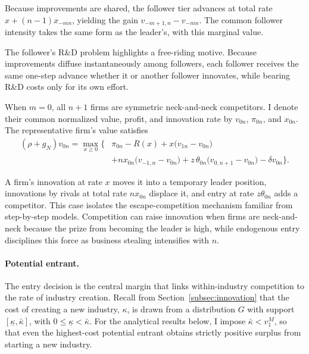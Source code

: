 \documentclass[12pt]{article}
\begin{document}
Because improvements are shared, the follower tier advances at total rate \(x + (n-1)x_{-mn}\), yielding the gain \(v_{-m+1,n}-v_{-mn}\). The common follower intensity takes the same form as the leader's, with this marginal value.

The follower's R\&D problem highlights a free-riding motive. Because improvements diffuse instantaneously among followers, each follower receives the same one-step advance whether it or another follower innovates, while bearing R\&D costs only for its own effort.

When \(m=0\), all \(n+1\) firms are symmetric neck-and-neck competitors. I denote their common normalized value, profit, and innovation rate by \(v_{0n}\), \(\pi_{0n}\), and \(x_{0n}\). The representative firm's value satisfies
\begin{align}
(\rho+g_N)v_{0n}=\max_{x\ge0}\Big\{&\pi_{0n}-R(x)+x\big(v_{1n}-v_{0n}\big)\nonumber\\
&+nx_{0n}\big(v_{-1,n}-v_{0n}\big)+z\,\theta_{0n}\big(v_{0,n+1}-v_{0n}\big)-\delta v_{0n}\Big\}.\label{eq:value0}
\end{align}

A firm's innovation at rate \(x\) moves it into a temporary leader position, innovations by rivals at total rate \(nx_{0n}\) displace it, and entry at rate \(z\theta_{0n}\) adds a competitor. This case isolates the escape-competition mechanism familiar from step-by-step models. Competition can raise innovation when firms are neck-and-neck because the prize from becoming the leader is high, while endogenous entry disciplines this force as business stealing intensifies with \(n\).

\paragraph{Potential entrant.}

The entry decision is the central margin that links within-industry competition to the rate of industry creation. Recall from Section~\ref{subsec:innovation} that the cost of creating a new industry, \(\kappa\), is drawn from a distribution \(G\) with support \([\underline{\kappa},\bar{\kappa}]\), with \(0 \leq \underline{\kappa} < \bar{\kappa}\). For the analytical results below, I impose \(\bar{\kappa} < v^M_1\), so that even the highest-cost potential entrant obtains strictly positive surplus from starting a new industry.
\end{document}
